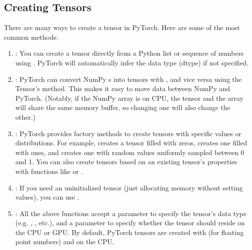 \documentclass[letterpaper,10pt,english]{jupyterBook}
\begin{document}
\subsection{Creating Tensors}
\label{\detokenize{04:creating-tensors}}
\sphinxAtStartPar
There are many ways to create a tensor in PyTorch. Here are some of the most common methods:
\begin{enumerate}
%
\item {} 
\sphinxAtStartPar
{}: You can create a tensor directly from a Python list or sequence of numbers using . PyTorch will automatically infer the data type (dtype) if not specified.

\item {} 
\sphinxAtStartPar
{}: PyTorch can convert NumPy s into tensors with , and vice versa using the Tensor’s  method. This makes it easy to move data between NumPy and PyTorch. (Notably, if the NumPy array is on CPU, the tensor and the array will share the same memory buffer, so changing one will also change the other.)

\item {} 
\sphinxAtStartPar
{}: PyTorch provides factory methods to create tensors with specific values or distributions. For example,  creates a tensor filled with zeros,  creates one filled with ones, and  creates one with random values uniformly sampled between 0 and 1. You can also create tensors based on an existing tensor’s properties with functions like  or .

\item {} 
\sphinxAtStartPar
{}: If you need an uninitialized tensor (just allocating memory without setting values), you can use .

\item {} 
\sphinxAtStartPar
{}: All the above functions accept a  parameter to specify the tensor’s data type (e.g. , , etc.), and a  parameter to specify whether the tensor should reside on the CPU or GPU. By default, PyTorch tensors are created with  (for floating point numbers) and on the CPU.

\end{enumerate}
\end{document}
